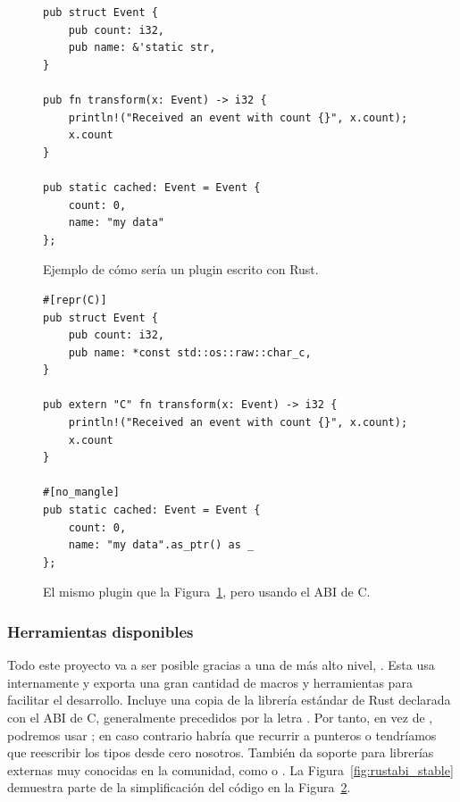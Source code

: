 \begin{figure}
    \centering
    \begin{verbatim}
pub struct Event {
    pub count: i32,
    pub name: &'static str,
}

pub fn transform(x: Event) -> i32 {
    println!("Received an event with count {}", x.count);
    x.count
}

pub static cached: Event = Event {
    count: 0,
    name: "my data"
};
    \end{verbatim}

    \caption{Ejemplo de cómo sería un plugin escrito con Rust.}%
    \label{fig:rustpure}
\end{figure}

\begin{figure}
    \centering
    \begin{verbatim}
#[repr(C)]
pub struct Event {
    pub count: i32,
    pub name: *const std::os::raw::char_c,
}

pub extern "C" fn transform(x: Event) -> i32 {
    println!("Received an event with count {}", x.count);
    x.count
}

#[no_mangle]
pub static cached: Event = Event {
    count: 0,
    name: "my data".as_ptr() as _
};
    \end{verbatim}

    \caption{El mismo plugin que la Figura~\ref{fig:rustpure}, pero usando el
    ABI de C.}%
    \label{fig:rustffi}
\end{figure}

\subsubsection{Herramientas disponibles}

Todo este proyecto va a ser posible gracias a una \crate de más alto nivel,
. Esta usa  internamente y exporta una
gran cantidad de macros y herramientas para facilitar el desarrollo. Incluye una
copia de la librería estándar de Rust declarada con el ABI de C, generalmente
precedidos por la letra . Por tanto, en vez de , podremos
usar ; en caso contrario habría que recurrir a punteros
 o tendríamos que reescribir los tipos desde cero nosotros.
También da soporte para librerías externas muy conocidas en la comunidad, como
 o . La
Figura~\ref{fig:rustabi_stable} demuestra parte de la simplificación del código
en la Figura~\ref{fig:rustffi}.

